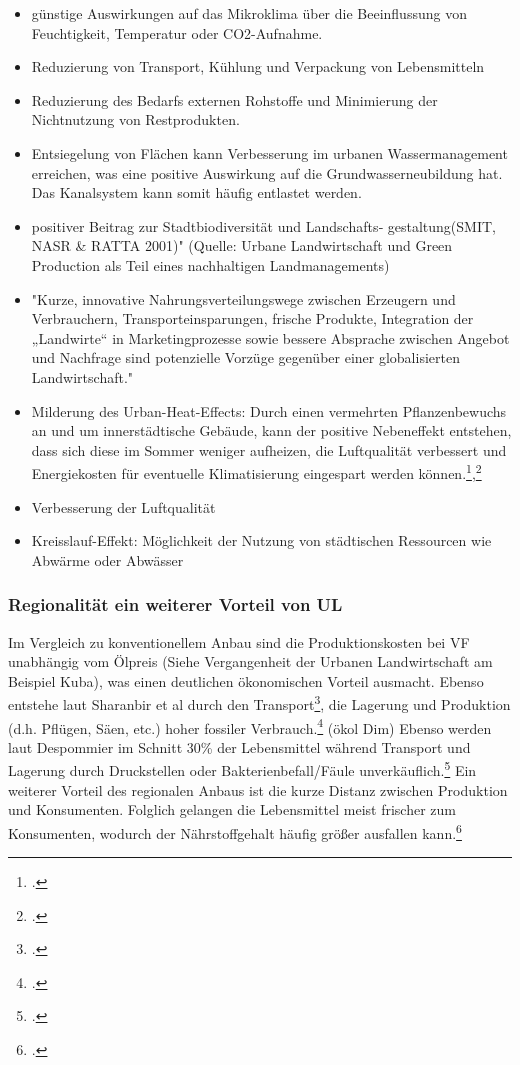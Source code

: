 \documentclass{scrartcl}
\begin{document}
\begin{itemize}
     \item günstige Auswirkungen auf das Mikroklima über die Beeinflussung von Feuchtigkeit, Temperatur oder CO2-Aufnahme.
     \item  Reduzierung von Transport, Kühlung und Verpackung von Lebensmitteln
     \item Reduzierung des Bedarfs externen Rohstoffe und Minimierung der Nichtnutzung von Restprodukten.
     \item Entsiegelung von Flächen kann Verbesserung im urbanen Wassermanagement erreichen, was eine positive Auswirkung auf die Grundwasserneubildung hat. Das Kanalsystem kann somit häufig entlastet werden.  
     \item positiver Beitrag zur Stadtbiodiversität und Landschafts‐ gestaltung(SMIT, NASR \& RATTA 2001)" (Quelle: Urbane Landwirtschaft und Green Production als Teil eines nachhaltigen Landmanagements)
     \item "Kurze, innovative Nahrungsverteilungswege zwischen Erzeugern und Verbrauchern, Transporteinsparungen, frische Produkte, Integration der „Landwirte“ in Marketingprozesse sowie bessere Absprache zwischen Angebot und Nachfrage sind potenzielle Vorzüge gegenüber einer globalisierten Landwirtschaft."
     \item Milderung des Urban-Heat-Effects: Durch einen vermehrten Pflanzenbewuchs an und um innerstädtische Gebäude, kann der positive Nebeneffekt entstehen, dass sich diese im Sommer weniger aufheizen, die Luftqualität verbessert und Energiekosten für eventuelle Klimatisierung eingespart werden können.\footcite{Schulz2013UrbaneLandmanagements},\footcite[Vgl.][S.16]{TobiasSpringDerBasel-Stadt}
     \item Verbesserung der Luftqualität
     \item  Kreisslauf-Effekt: Möglichkeit der Nutzung von städtischen Ressourcen wie Abwärme oder Abwässer
\end{itemize}

\subsubsection{Regionalität ein weiterer Vorteil von UL}

Im Vergleich zu konventionellem Anbau sind die Produktionskosten bei VF unabhängig vom Ölpreis (Siehe {Vergangenheit der Urbanen Landwirtschaft} am Beispiel Kuba), was einen deutlichen ökonomischen Vorteil ausmacht.
Ebenso entstehe laut Sharanbir et al durch den Transport\footcite[Vgl.][]{GrewalCanFood}, die Lagerung und Produktion (d.h. Pflügen, Säen, etc.) hoher fossiler Verbrauch.\footcite[]{2012TheEssay} (ökol Dim) 
Ebenso werden laut Despommier im Schnitt 30\% der Lebensmittel während Transport und Lagerung durch Druckstellen oder Bakterienbefall/Fäule unverkäuflich.\footcite{Despommier2009TheFarms}
Ein weiterer Vorteil des regionalen Anbaus ist die kurze Distanz zwischen Produktion und Konsumenten. Folglich gelangen die Lebensmittel meist frischer zum Konsumenten, wodurch der Nährstoffgehalt häufig größer ausfallen kann.\footcite{Despommier2009TheFarms}
\end{document}
